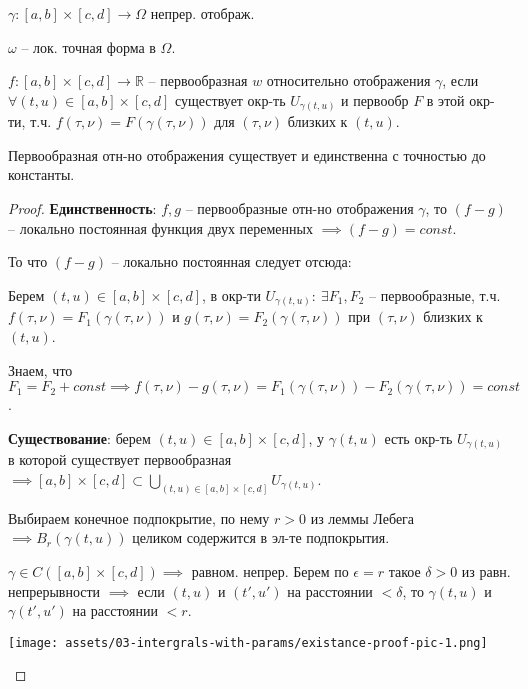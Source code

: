 \begin{definition}
    $\gamma: [a, b] \times [c, d] \rightarrow \Omega$ непрер. отображ.
    
    $\omega$ -- лок. точная форма в $\Omega$.

    $f: [a, b] \times [c, d] \rightarrow \mathbb{R}$ -- первообразная $w$ относительно отображения $\gamma$, если $\forall (t, u) \in [a, b] \times [c, d]$ существует окр-ть $U_{\gamma(t, u)}$ и первообр $F$ в этой окр-ти, т.ч. $f(\tau, \nu) = F(\gamma(\tau, \nu))$ для $(\tau, \nu)$ близких к $(t, u)$.
\end{definition}

\begin{theorem}
    Первообразная отн-но отображения существует и единственна с точностью до константы.
\end{theorem}
\begin{proof}

    \textbf{Единственность}: $f, g$ -- первообразные отн-но отображения $\gamma$, то $(f - g)$ -- локально постоянная функция двух переменных $\implies (f - g) = const$.

    То что $(f - g)$ -- локально постоянная следует отсюда:

    Берем $(t, u) \in [a, b] \times [c, d]$, в окр-ти $U_{\gamma(t, u)}: \ \exists F_1, F_2$ -- первообразные, т.ч. $f(\tau, \nu) = F_1(\gamma(\tau, \nu))$ и $g(\tau, \nu) = F_2(\gamma(\tau, \nu))$ при $(\tau, \nu)$ близких к $(t, u)$.

    Знаем, что $F_1 = F_2 + const \implies f(\tau, \nu) - g(\tau, \nu) = F_1(\gamma(\tau, \nu)) - F_2(\gamma(\tau, \nu)) = const$.

    \textbf{Существование}: берем $(t, u) \in [a, b] \times [c, d]$, у $\gamma(t, u)$ есть окр-ть $U_{\gamma(t, u)}$ в которой существует первообразная $\implies [a, b] \times [c, d] \subset \bigcup_{(t, u) \in [a, b] \times [c, d]} {U_{\gamma(t, u)}}$.
    
    Выбираем конечное подпокрытие, по нему $r > 0$ из леммы Лебега $\implies B_r(\gamma(t, u))$ целиком содержится в эл-те подпокрытия.
    
    $\gamma \in C\left( [a, b] \times [c, d] \right) \implies $ равном. непрер. Берем по $\epsilon = r$ такое $\delta > 0$ из равн. непрерывности $\implies$ если $(t, u)$ и $(t', u')$ на расстоянии $< \delta$, то $\gamma(t, u)$ и $\gamma(t', u')$ на расстоянии $< r$.

    \begin{center}
        \texttt{[image: assets/03-intergrals-with-params/existance-proof-pic-1.png]}
    \end{center}



\end{proof}
